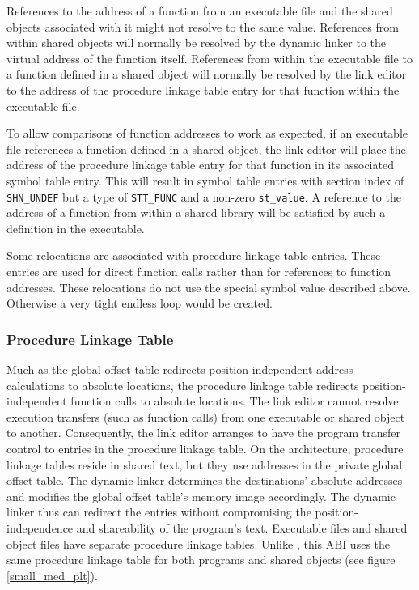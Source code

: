 References to the address of a function from an executable
file and the shared objects associated with it might not resolve to
the same value. References from within shared objects will normally be
resolved by the dynamic linker to the virtual address of the function
itself. References from within the executable file to a function
defined in a shared object will normally be resolved by the link
editor to the address of the procedure linkage table entry for that
function within the executable file.

To allow comparisons of function addresses to work as expected, if an
executable file references a function defined in a shared object, the
link editor will place the address of the procedure linkage table
entry for that function in its associated symbol table entry. This
will result in symbol table entries with section index of {\tt SHN_UNDEF}
but a type of {\tt STT_FUNC} and a non-zero {\tt st_value}.  A reference to the
address of a function from within a shared library will be satisfied
by such a definition in the executable.

Some relocations are associated with procedure linkage table
entries. These entries are used for direct function calls rather than
for references to function addresses. These relocations do not use the special
symbol value described above. Otherwise a very tight endless loop
would be created.

\subsubsection{Procedure Linkage Table}



Much as the global offset table redirects position-independent address
calculations to absolute locations, the procedure linkage table
redirects position-independent function calls to absolute locations.
The link editor cannot resolve execution transfers (such as function
calls) from one executable or shared object to another.  Consequently,
the link editor arranges to have the program transfer control to
entries in the procedure linkage table.  On the \xARCH architecture,
procedure linkage tables reside in shared text, but they use addresses
in the private global offset table.  The dynamic linker determines the
destinations' absolute addresses and modifies the global offset
table's memory image accordingly.  The dynamic linker thus can
redirect the entries without compromising the position-independence
and shareability of the program's text.  Executable files and shared
object files have separate procedure linkage tables.  Unlike
\intelabi, this ABI uses the same procedure linkage table for both
programs and shared objects (see figure \ref{small_med_plt}).

